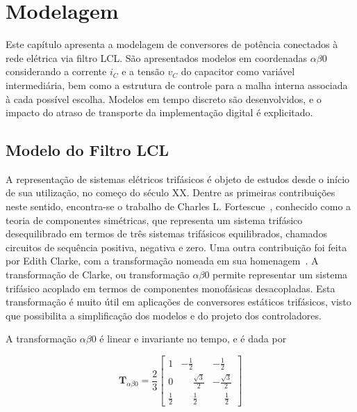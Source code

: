 
\chapter{Modelagem}\label{modelagem}

	Este capítulo apresenta a modelagem de conversores de potência conectados à rede
    elétrica via filtro LCL. São apresentados modelos em coordenadas $\alpha \beta 0$
    considerando a corrente $i_C$ e a tensão $v_C$ do capacitor como variável
    intermediária, bem como a estrutura de controle para a malha interna associada à
    cada possível escolha. Modelos em tempo discreto são desenvolvidos, e o impacto do
    atraso de transporte da implementação digital é explicitado.


\section{Modelo do Filtro LCL}

    A representação de sistemas elétricos trifásicos é objeto de estudos desde o
    início de sua utilização, no começo do século XX. Dentre as primeiras contribuições
    neste sentido, encontra-se o trabalho de Charles L. Fortescue~\cite{ref:FORTESCUE},
    conhecido como a teoria de componentes simétricas, que representa um sistema trifásico
    desequilibrado em termos de três sistemas trifásicos equilibrados, chamados circuitos
    de sequência positiva, negativa e zero. Uma outra contribuição foi feita por Edith
    Clarke, com a transformação nomeada em sua homenagem~\cite{ref:CLARKE}. A transformação
    de Clarke, ou transformação $\alpha \beta 0$ permite representar um sistema trifásico
    acoplado em termos de componentes monofásicas desacopladas. Esta transformação é muito
    útil em aplicações de conversores estáticos trifásicos, visto que possibilita a
    simplificação dos modelos e do projeto dos controladores.

    A transformação $\alpha \beta 0$ é linear e invariante no tempo, e é dada por

    \begin{equation}
        \mathbf{T}_{\alpha \beta 0} = \frac{2}{3} \left[
        \begin{array}{ccc}
            1 & -\frac{1}{2} & -\frac{1}{2} \\[0.3em]
            0 & \phantom{-}\frac{\sqrt{3}}{2} & -\frac{\sqrt{3}}{2} \\[0.3em]
            \frac{1}{2} &  \phantom{-}\frac{1}{2} & \phantom{-}\frac{1}{2}
        \end{array}
        \right]
        \label{eq:alpha_beta_0}
    \end{equation}

